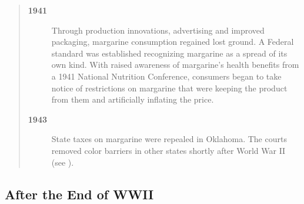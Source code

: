 \documentclass[mnsc,blindrev]{informs3} %
\begin{document}
\begin{quotation}
\begin{description}
\item[\bf 1941] Through production innovations, advertising and improved
packaging, margarine consumption regained lost ground. A Federal
standard  was established recognizing margarine as a spread of its
own kind. With raised awareness of margarine's health benefits from
a 1941 National Nutrition Conference, consumers began to take notice
of restrictions on margarine that were keeping the product from them
and artificially inflating the price.

\item[\bf 1943] State taxes on margarine were repealed in Oklahoma. The courts
removed color barriers in other states shortly after World War II (see \citealt{tjp}).

\end{description}

\end{quotation}


\subsection{After the End of WWII}
\end{document}
